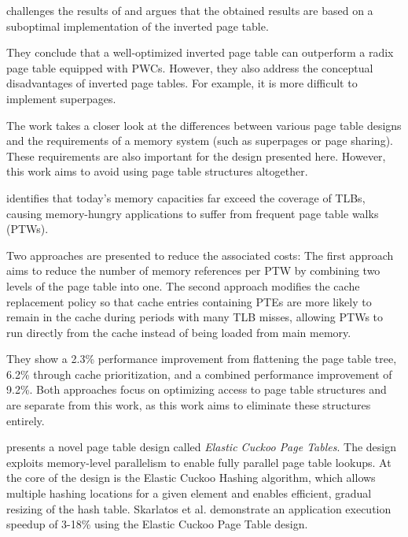 \textbf{\cite{yaniv2016hash}} challenges the results of \cite{barrTranslationCachingSkip} and argues that the obtained results are based on a suboptimal implementation of the inverted page table.

They conclude that a well-optimized inverted page table can outperform a radix page table equipped with PWCs. However, they also address the conceptual disadvantages of inverted page tables. For example, it is more difficult to implement superpages.

The work takes a closer look at the differences between various page table designs and the requirements of a memory system (such as superpages or page sharing). These requirements are also important for the design presented here. However, this work aims to avoid using page table structures altogether.



\textbf{\cite{park2022every}} identifies that today’s memory capacities far exceed the coverage of TLBs, causing memory-hungry applications to suffer from frequent page table walks (PTWs).

Two approaches are presented to reduce the associated costs: The first approach aims to reduce the number of memory references per PTW by combining two levels of the page table into one. The second approach modifies the cache replacement policy so that cache entries containing PTEs are more likely to remain in the cache during periods with many TLB misses, allowing PTWs to run directly from the cache instead of being loaded from main memory.

They show a 2.3\% performance improvement from flattening the page table tree, 6.2\% through cache prioritization, and a combined performance improvement of 9.2\%. Both approaches focus on optimizing access to page table structures and are separate from this work, as this work aims to eliminate these structures entirely.



\textbf{\cite{skarlatos2020elastic}} presents a novel page table design called \textit{Elastic Cuckoo Page Tables}. The design exploits memory-level parallelism to enable fully parallel page table lookups. At the core of the design is the Elastic Cuckoo Hashing algorithm, which allows multiple hashing locations for a given element and enables efficient, gradual resizing of the hash table. Skarlatos et al. demonstrate an application execution speedup of 3-18\% using the Elastic Cuckoo Page Table design.



